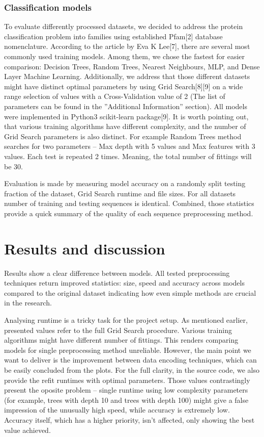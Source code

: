 \documentclass[12pt]{article}
\begin{document}
\subsubsection*{Classification models}
To evaluate differently processed datasets, we decided to address the protein classification problem into families using established Pfam[2] database nomenclature. 
According to the article by Eva K Lee[7], there are several most commonly used training models. Among them, we chose the fastest for easier comparison: Decision Trees, Random Trees, Nearest Neighbours, MLP, and Dense Layer Machine Learning. 
Additionally, we address that those different datasets might have distinct optimal parameters by using Grid Search[8][9] on a wide range selection of values with a Cross-Validation value of 2 (The list of parameters can be found in the ''Additional Information'' section). All models were implemented in Python3 scikit-learn package[9].  It is worth pointing out, that various training algorithms have different complexity, and the number of Grid Search parameters is also distinct. For example Random Trees method searches for two parameters -- Max depth with 5 values and Max features with 3 values. Each test is repeated 2 times. Meaning, the total number of fittings will be 30.

Evaluation is made by measuring model accuracy on a randomly split testing fraction of the dataset, Grid Search runtime and file sizes. For all datasets number of training and testing sequences is identical.
Combined, those statistics provide a quick summary of the quality of each sequence preprocessing method.

\section*{Results and discussion}

Results show a clear difference between models. All tested preprocessing techniques return improved statistics: size, speed and accuracy across models compared to the original dataset indicating how even simple methods are crucial in the research. 

Analysing runtime is a tricky task for the project setup. As mentioned earlier, presented values refer to the full Grid Search procedure. Various training algorithms might have different number of fittings. This renders comparing models for single preprocessing method unreliable. However, the main point we want to deliver is the improvement between data encoding techniques, which can be easily concluded from the plots.
For the full clarity, in the source code, we also provide the refit runtimes with optimal parameters. Those values contrastingly present the oposite problem -- single runtime using low complexity parameters (for example, trees with depth 10 and trees with depth 100) might give a false impression of the unusually high speed, while accuracy is extremely low.
Accuracy itself, which has a higher priority, isn't affected, only showing the best value achieved.
\end{document}
